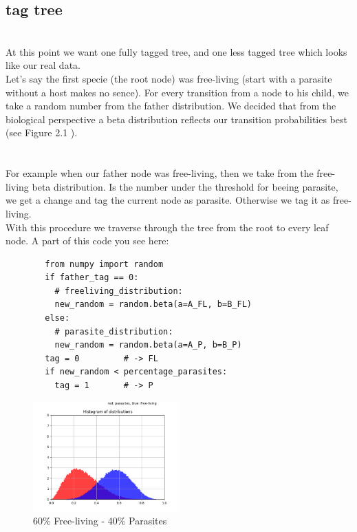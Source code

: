     \subsection{tag tree}
       \\
      At this point we want one fully tagged tree, and one less tagged tree which looks like our real 
        data.\\
      Let's say the first specie (the root node) was free-living (start with a parasite without a host 
        makes no sence). For every transition from a node to his child, we take a random number from
        the father distribution. We decided that from the biological perspective a beta distribution
        reflects our transition probabilities best (see Figure 2.1 ). \\
       \\
       \\
      For example when our father node was free-living, then we take from the free-living beta
        distribution. Is the number under the threshold for beeing parasite, we get a change and tag
        the current node as parasite. Otherwise we tag it as free-living. \\
      With this procedure we traverse through the tree from the root to every leaf node. A part of
        this code you see here:
      \begin{lstlisting}
        from numpy import random
        if father_tag == 0:
          # freeliving_distribution:
          new_random = random.beta(a=A_FL, b=B_FL)
        else:
          # parasite_distribution:
          new_random = random.beta(a=A_P, b=B_P)
        tag = 0         # -> FL
        if new_random < percentage_parasites:
          tag = 1       # -> P
      \end{lstlisting}
      \begin{figure}
        \caption{60\% Free-living - 40\% Parasites}
        \centering
          \includegraphics[width=0.5\textwidth]{Figures/40-60.png}
      \end{figure}
